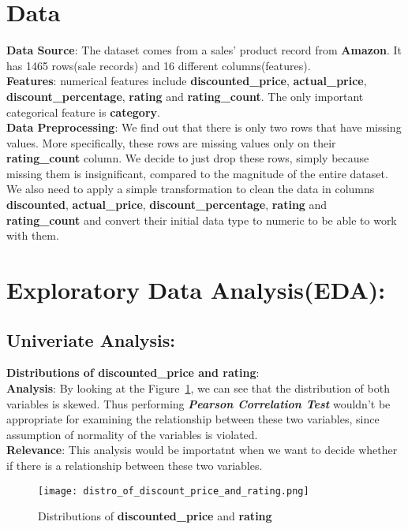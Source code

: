 \documentclass[a4paper,12pt]{article}
\begin{document}
\section*{Data}
\textbf{Data Source}: The dataset comes from a sales' product record from \textbf{Amazon}. It has 1465 rows(sale records) and 16 different columns(features). \\

\noindent\textbf{Features}: numerical features include \textbf{discounted\_price}, \textbf{actual\_price}, \textbf{discount\_percentage}, \textbf{rating} and \textbf{rating\_count}.  The only important categorical feature is \textbf{category}. \\ 

\noindent\textbf{Data Preprocessing}: We find out that there is only two rows that have missing values. More specifically, these rows are missing values only on their \textbf{rating\_count} column.  We decide to just drop these rows, simply because missing them is insignificant, compared to the magnitude of the entire dataset.  We also need to apply a simple transformation to clean the data in columns \textbf{discounted}, \textbf{actual\_price}, \textbf{discount\_percentage}, \textbf{rating} and \textbf{rating\_count} and convert their initial data type to numeric to be able to work with them.


\section*{Exploratory Data Analysis(EDA):}
\subsection*{Univeriate Analysis:}
\textbf{Distributions of discounted\_price and rating}: \\

\noindent\textbf{Analysis}: By looking at the Figure~\ref{fig:Figure_1}, we can see that the distribution of both variables is skewed. Thus performing \textit{\textbf{Pearson Correlation Test}} wouldn't be appropriate for examining the relationship between these two variables, since assumption of normality of the variables is violated. \\

\noindent\textbf{Relevance}: This analysis would be importatnt when we want to decide whether if there is a relationship between these two variables. \\

\begin{figure}[H]
    \centering
    \texttt{[image: distro\_of\_discount\_price\_and\_rating.png]} %
    \caption{Distributions of \textbf{discounted\_price} and \textbf{rating}}
    \label{fig:Figure_1}
\end{figure}
\end{document}
